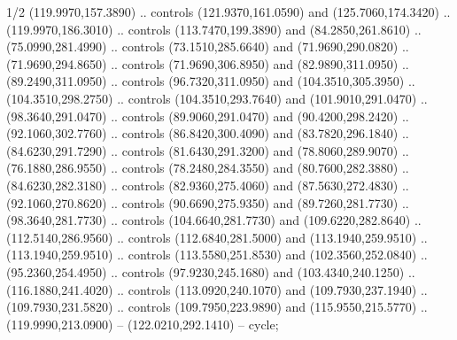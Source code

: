 \begin{flagdescription}{1/2}
{  (119.9970,157.3890) .. controls (121.9370,161.0590) and (125.7060,174.3420) ..
  (119.9970,186.3010) .. controls (113.7470,199.3890) and (84.2850,261.8610) ..
  (75.0990,281.4990) .. controls (73.1510,285.6640) and (71.9690,290.0820) ..
  (71.9690,294.8650) .. controls (71.9690,306.8950) and (82.9890,311.0950) ..
  (89.2490,311.0950) .. controls (96.7320,311.0950) and (104.3510,305.3950) ..
  (104.3510,298.2750) .. controls (104.3510,293.7640) and (101.9010,291.0470) ..
  (98.3640,291.0470) .. controls (89.9060,291.0470) and (90.4200,298.2420) ..
  (92.1060,302.7760) .. controls (86.8420,300.4090) and (83.7820,296.1840) ..
  (84.6230,291.7290) .. controls (81.6430,291.3200) and (78.8060,289.9070) ..
  (76.1880,286.9550) .. controls (78.2480,284.3550) and (80.7600,282.3880) ..
  (84.6230,282.3180) .. controls (82.9360,275.4060) and (87.5630,272.4830) ..
  (92.1060,270.8620) .. controls (90.6690,275.9350) and (89.7260,281.7730) ..
  (98.3640,281.7730) .. controls (104.6640,281.7730) and (109.6220,282.8640) ..
  (112.5140,286.9560) .. controls (112.6840,281.5000) and (113.1940,259.9510) ..
  (113.1940,259.9510) .. controls (113.5580,251.8530) and (102.3560,252.0840) ..
  (95.2360,254.4950) .. controls (97.9230,245.1680) and (103.4340,240.1250) ..
  (116.1880,241.4020) .. controls (113.0920,240.1070) and (109.7930,237.1940) ..
  (109.7930,231.5820) .. controls (109.7950,223.9890) and (115.9550,215.5770) ..
  (119.9990,213.0900) -- (122.0210,292.1410) -- cycle;}
\def\detailII{%
  [gold](120.0000,72.9220) .. controls (120.0000,72.9220) and
  (110.3900,64.8460) .. (107.1260,68.8970) .. controls (101.8760,75.4120) and
  (123.2660,107.8650) .. (123.2660,119.2930) .. controls (123.2660,138.0520) and
  (110.7490,143.1530) .. (95.2930,145.8320) .. controls (84.9220,147.6300) and
  (68.0340,145.0800) .. (68.0340,145.0800) .. controls (71.2140,140.8070) and
  (73.2820,139.5480) .. (78.6400,139.2070) .. controls (72.6750,136.1100) and
  (66.6010,129.3870) .. (66.6010,118.9230) .. controls (66.6010,102.7850) and
  (73.2440,96.1330) .. (73.2440,77.9400) .. controls (73.2440,67.8470) and
  (64.9680,54.9990) .. (64.9680,54.9990) .. controls (79.5970,56.4630) and
  (86.8470,70.0080) .. (82.7220,80.8330) .. controls (85.0500,81.1680) and
  (87.1640,80.6430) .. (88.9800,78.9230) .. controls (90.0500,81.9230) and
  (88.3600,85.4060) .. (86.0970,88.4070) .. controls (87.9200,89.3810) and
  (89.2590,88.7970) .. (92.1630,88.1970) .. controls (91.8870,91.2890) and
  (90.0350,94.5730) .. (85.5030,97.6650) .. controls (98.6540,94.2500) and
  (106.7460,103.4160) .. (106.7460,113.0120) .. controls (106.7460,120.2600) and
}
\end{flagdescription}
